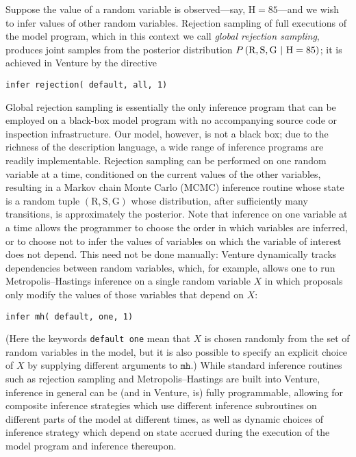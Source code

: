 Suppose the value of a random variable is observed---say, $\text{H} = 85$---and
we wish to infer values of other random variables.  Rejection sampling of full
executions of the model program, which in this context we call \emph{global
rejection sampling}, produces joint samples from the posterior distribution
$P\left( \text{R}, \text{S}, \text{G} \ \middle\vert\  \text{H}=85 \right)$; it is achieved in
Venture by the directive
\begin{lstlisting}
infer rejection( default, all, 1)
\end{lstlisting}
Global rejection sampling is essentially the only inference program that
can be employed on a black-box model program with no accompanying source
code or inspection infrastructure.  Our model, however, is not a black box;
due to the richness of the description language, a wide range of inference
programs are readily implementable.  Rejection sampling can be performed on
one random variable at a time, conditioned on the current values of the
other variables, resulting in a Markov chain Monte Carlo (MCMC) inference
routine whose state is a random tuple $(\text{R}, \text{S}, \text{G})$
whose distribution, after sufficiently many transitions, is approximately
the posterior.
Note that inference on one variable at a time allows the programmer to
choose the order in which variables are inferred, or to choose not to infer
the values of variables on which the variable of interest does not depend.
This need not be done manually: Venture dynamically tracks dependencies between
random variables, which, for example, allows one to run Metropolis--Hastings
inference on a single random variable $X$ in which proposals only modify the
values of those variables that depend on $X$:
\begin{lstlisting}
infer mh( default, one, 1)
\end{lstlisting}
(Here the keywords \texttt{default one} mean that $X$ is chosen randomly from
the set of random variables in the model, but it is also possible to specify an
explicit choice of $X$ by supplying different arguments to $\texttt{mh}$.)
While standard inference routines such as rejection sampling and
Metropolis--Hastings are built into Venture, inference in general can be (and in
Venture, is) fully programmable, allowing for composite inference strategies
which use different inference subroutines on different parts of the model at
different times, as well as dynamic choices of inference strategy which depend
on state accrued during the execution of the model program and inference
thereupon.

